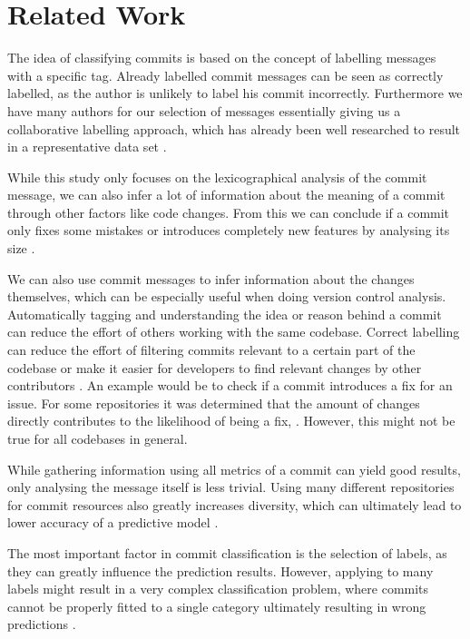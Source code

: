 \section{Related Work}
\label{sec:related-work}

The idea of classifying commits is based on the concept of labelling
messages with a specific tag. Already labelled commit messages can be
seen as correctly labelled, as the author is unlikely to label his commit
incorrectly. Furthermore we have many authors for our selection of
messages essentially giving us a collaborative labelling approach,
which has already been well researched to result in a representative
data set \cite{Golder2006}.

While this study only focuses on the lexicographical analysis of the
commit message, we can also infer a lot of information about the meaning
of a commit through other factors like code changes. From this we can
conclude if a commit only fixes some mistakes or introduces completely
new features by analysing its size \cite{Hindle2008}.

We can also use commit messages to infer information about the
changes themselves, which can be especially useful when doing version
control analysis. Automatically tagging and understanding the idea
or reason behind a commit can reduce the effort of others working
with the same codebase. Correct labelling can reduce the effort
of filtering commits relevant to a certain part of the codebase or
make it easier for developers to find relevant changes by other
contributors \cite{Mockus2000}. An example would be to check if
a commit introduces a fix for an issue. For some repositories
it was determined that the amount of changes directly contributes
to the likelihood of being a fix, \cite{Sliwerski2005}. However,
this might not be true for all codebases in general.

While gathering information using all metrics of a commit can yield
good results, only analysing the message itself is less trivial.
Using many different repositories for commit resources also greatly
increases diversity, which can ultimately lead to lower accuracy
of a predictive model \cite{Mockus2000,Santos2020}.

The most important factor in commit classification is the selection
of labels, as they can greatly influence the prediction results.
However, applying to many labels might result in a very complex
classification problem, where commits cannot be properly fitted
to a single category ultimately resulting in wrong predictions
\cite{Santos2020}.
